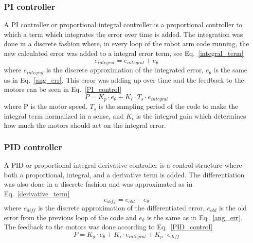\subsubsection{PI controller}
A PI controller or proportional integral controller is a proportional controller to which a term which integrates the error over time is added. The integration was done in a discrete fashion where, in every loop of the robot arm code running, the new calculated error was added to a integral error term, see Eq.~\eq\ref{integral_term}
\begin{equation}
    e_{integral} = e_{integral} + e_{\theta}
    \label{integral_term}
\end{equation}
where \(e_{integral}\) is the discrete approximation of the integrated error, \(e_{\theta}\) is the same as in Eq.~\eq\ref{ang_err}. This error was adding up over time and the feedback to the motors can be seen in Eq.~\eq\ref{PI_control}
\begin{equation}
    P = K_p\cdot e_{\theta} + K_i\cdot T_s\cdot e_{integral}
    \label{PI_control}
\end{equation}
where P is the motor speed, \(T_s\) is the sampling period of the code to make the integral term normalized in a sense, and \(K_i\) is the integral gain which determines how much the motors should act on the integral error.

\subsubsection{PID controller}
A PID or proportional integral derivative controller is a control structure where both a proportional, integral, and a derivative term is added. The differentiation was also done in a discrete fashion and was approximated as in Eq.~\eq\ref{derivative_term}
\begin{equation}
    e_{diff} = e_{old} - e_{\theta}
    \label{derivative_term}
\end{equation}
where \(e_{diff}\) is the discrete approximation of the differentiated error, \(e_{old}\) is the old error from the previous loop of the code and \(e_{\theta}\) is the same as in Eq.~\eq\ref{ang_err}. The feedback to the motors was done according to Eq.~\eq\ref{PID_control}
\begin{equation}
    P = K_p\cdot e_{\theta} + K_i\cdot e_{integral} + K_p\cdot e_{diff}
    \label{PID_control}
\end{equation}
